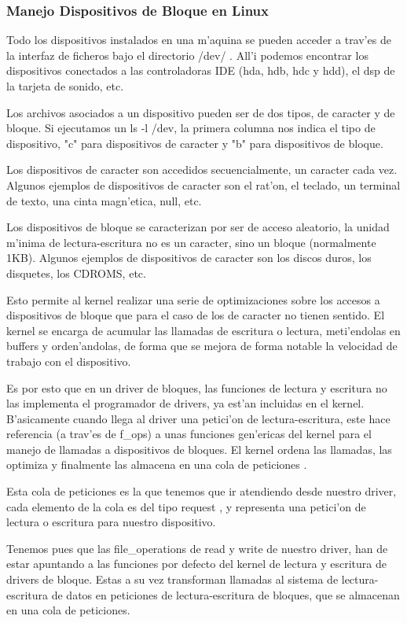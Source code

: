 \subsubsection{Manejo Dispositivos de Bloque en Linux}
Todo los dispositivos instalados en una m'aquina se pueden acceder a trav'es de la interfaz de ficheros bajo el directorio /dev/ . All'i podemos encontrar los dispositivos conectados a las controladoras IDE (hda, hdb, hdc y hdd), el dsp de la tarjeta de sonido, etc.

Los archivos asociados a un dispositivo pueden ser de dos tipos, de caracter y de bloque. Si ejecutamos un ls -l /dev, la primera columna nos indica el tipo de dispositivo, "c" para dispositivos de caracter y "b" para dispositivos de bloque.

Los dispositivos de caracter son accedidos secuencialmente, un caracter cada vez. Algunos ejemplos de dispositivos de caracter son el rat'on, el teclado, un terminal de texto, una cinta magn'etica, null, etc.

Los dispositivos de bloque se caracterizan por ser de acceso aleatorio, la unidad m'inima de lectura-escritura no es un caracter, sino un bloque (normalmente 1KB). Algunos ejemplos de dispositivos de caracter son los discos duros, los disquetes, los CDROMS, etc. 

Esto permite al kernel realizar una serie de optimizaciones sobre los accesos a dispositivos de bloque que para el caso de los de caracter no tienen sentido. El kernel se encarga de acumular las llamadas de escritura o lectura, meti'endolas en buffers y orden'andolas, de forma que se mejora de forma notable la velocidad de trabajo con el dispositivo.

Es por esto que en un driver de bloques, las funciones de lectura y escritura no las implementa el programador de drivers, ya est'an incluidas en el kernel. B'asicamente cuando llega al driver una petici'on de lectura-escritura, este hace referencia (a trav'es de f\_ops) a unas funciones gen'ericas del kernel para el manejo de llamadas a dispositivos de bloques. El kernel ordena las llamadas, las optimiza y finalmente las almacena en una cola de peticiones .

Esta cola de peticiones es la que tenemos que ir atendiendo desde nuestro driver, cada elemento de la cola es del tipo request , y representa una petici'on de lectura o escritura para nuestro dispositivo.

Tenemos pues que las file\_operations de read y write de nuestro driver, han de estar apuntando a las funciones por defecto del kernel de lectura y escritura de drivers de bloque. Estas a su vez transforman llamadas al sistema de lectura-escritura de datos en peticiones de lectura-escritura de bloques, que se almacenan en una cola de peticiones.
			

